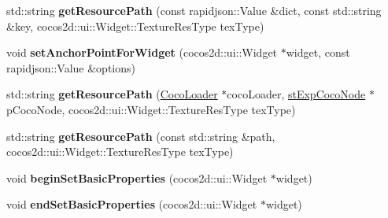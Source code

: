 \begin{DoxyCompactItemize}
std\+::string {\bfseries get\+Resource\+Path} (const rapidjson\+::\+Value \&dict, const std\+::string \&key, cocos2d\+::ui\+::\+Widget\+::\+Texture\+Res\+Type tex\+Type)
\item 
\mbox{\label{classcocostudio_1_1WidgetReader_a017a7e775ee68dc539d6d900063d7202}} 
void {\bfseries set\+Anchor\+Point\+For\+Widget} (cocos2d\+::ui\+::\+Widget $\ast$widget, const rapidjson\+::\+Value \&options)
\item 
\mbox{\label{classcocostudio_1_1WidgetReader_abd6f9ca97aa397471062889b36f7eab4}} 
std\+::string {\bfseries get\+Resource\+Path} (\hyperlink{classcocostudio_1_1CocoLoader}{Coco\+Loader} $\ast$coco\+Loader, \hyperlink{structcocostudio_1_1stExpCocoNode}{st\+Exp\+Coco\+Node} $\ast$p\+Coco\+Node, cocos2d\+::ui\+::\+Widget\+::\+Texture\+Res\+Type tex\+Type)
\item 
\mbox{\label{classcocostudio_1_1WidgetReader_a18dfec1bd6b3830e2819ffc0a7439185}} 
std\+::string {\bfseries get\+Resource\+Path} (const std\+::string \&path, cocos2d\+::ui\+::\+Widget\+::\+Texture\+Res\+Type tex\+Type)
\item 
\mbox{\label{classcocostudio_1_1WidgetReader_a11e28479d394fc102f2d62e50a53eaeb}} 
void {\bfseries begin\+Set\+Basic\+Properties} (cocos2d\+::ui\+::\+Widget $\ast$widget)
\item 
\mbox{\label{classcocostudio_1_1WidgetReader_adfb18f27b32d532411e19fcc1afc3cf4}} 
void {\bfseries end\+Set\+Basic\+Properties} (cocos2d\+::ui\+::\+Widget $\ast$widget)
\end{DoxyCompactItemize}
